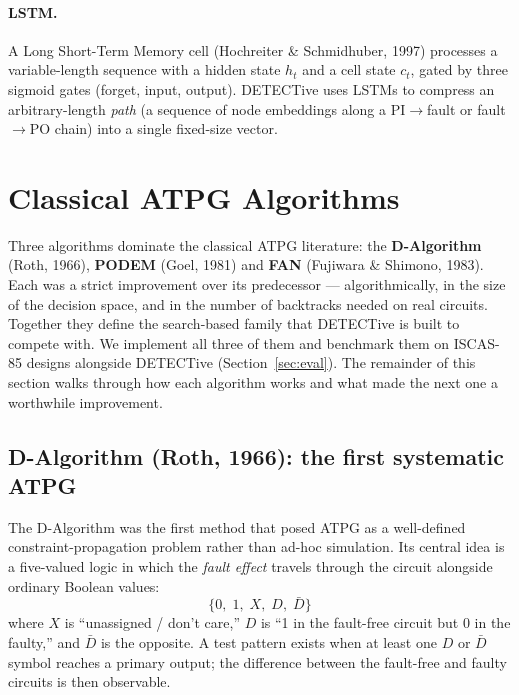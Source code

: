\documentclass[11pt,a4paper]{article}
\newcommand{\bd}[1]{\textbf{#1}}
\begin{document}
\paragraph{LSTM.} A Long Short-Term Memory cell (Hochreiter \&
Schmidhuber, 1997) processes a variable-length sequence with a hidden
state $h_t$ and a cell state $c_t$, gated by three sigmoid gates
(forget, input, output). DETECTive uses LSTMs to compress an
arbitrary-length \emph{path} (a sequence of node embeddings along a
PI$\to$fault or fault$\to$PO chain) into a single fixed-size vector.

\section{Classical ATPG Algorithms}
\label{sec:classical}

Three algorithms dominate the classical ATPG literature: the
\bd{D-Algorithm} (Roth, 1966), \bd{PODEM} (Goel, 1981) and \bd{FAN}
(Fujiwara \& Shimono, 1983). Each was a strict improvement over its
predecessor --- algorithmically, in the size of the decision space,
and in the number of backtracks needed on real circuits. Together they
define the search-based family that DETECTive is built to compete
with. We implement all three of them and benchmark them on ISCAS-85
designs alongside DETECTive (Section~\ref{sec:eval}). The remainder of this section walks through
how each algorithm works and what made the next one a worthwhile
improvement.

\subsection{D-Algorithm (Roth, 1966): the first systematic ATPG}

The D-Algorithm was the first method that posed ATPG as a well-defined
constraint-propagation problem rather than ad-hoc simulation. Its
central idea is a five-valued logic in which the \emph{fault effect}
travels through the circuit alongside ordinary Boolean values:
\[
  \{0,\; 1,\; X,\; D,\; \bar{D}\}
\]
where $X$ is ``unassigned / don't care,''
$D$ is ``1 in the fault-free circuit but 0 in the faulty,'' and
$\bar D$ is the opposite. A test pattern exists when at least one $D$
or $\bar D$ symbol reaches a primary output; the difference between
the fault-free and faulty circuits is then observable.
\end{document}
